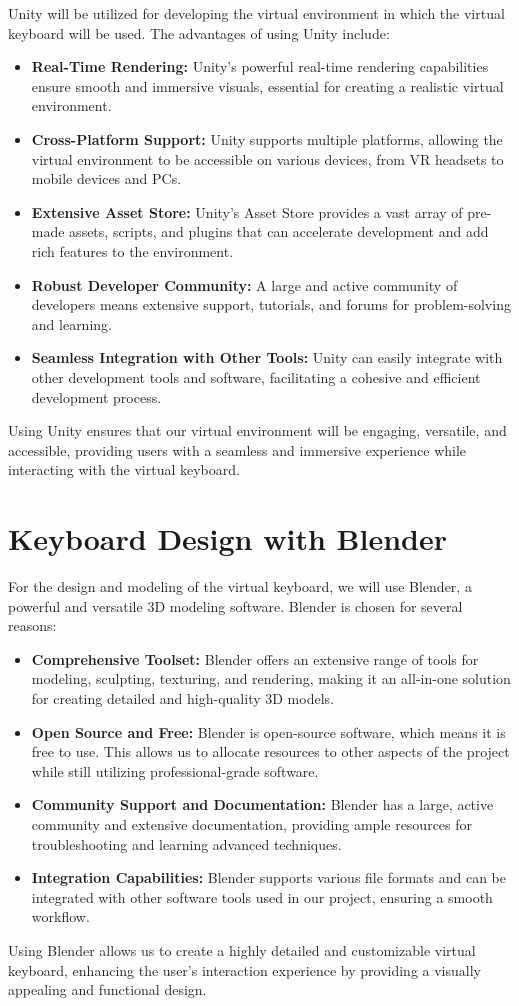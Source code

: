 Unity will be utilized for developing the virtual environment in which the virtual keyboard will be used. The advantages of using Unity include:
\begin{itemize}
\item \textbf{Real-Time Rendering:} Unity's powerful real-time rendering capabilities ensure smooth and immersive visuals, essential for creating a realistic virtual environment.
\item \textbf{Cross-Platform Support:} Unity supports multiple platforms, allowing the virtual environment to be accessible on various devices, from VR headsets to mobile devices and PCs.
\item \textbf{Extensive Asset Store:} Unity's Asset Store provides a vast array of pre-made assets, scripts, and plugins that can accelerate development and add rich features to the environment.
\item \textbf{Robust Developer Community:} A large and active community of developers means extensive support, tutorials, and forums for problem-solving and learning.
\item \textbf{Seamless Integration with Other Tools:} Unity can easily integrate with other development tools and software, facilitating a cohesive and efficient development process.
\end{itemize}
Using Unity ensures that our virtual environment will be engaging, versatile, and accessible, providing users with a seamless and immersive experience while interacting with the virtual keyboard.


\section{Keyboard Design with Blender}
\label{subsec:KeyboardDesignWithBlender}

For the design and modeling of the virtual keyboard, we will use Blender, a powerful and versatile 3D modeling software. Blender is chosen for several reasons:
\begin{itemize}
\item \textbf{Comprehensive Toolset:} Blender offers an extensive range of tools for modeling, sculpting, texturing, and rendering, making it an all-in-one solution for creating detailed and high-quality 3D models.
\item \textbf{Open Source and Free:} Blender is open-source software, which means it is free to use. This allows us to allocate resources to other aspects of the project while still utilizing professional-grade software.
\item \textbf{Community Support and Documentation:} Blender has a large, active community and extensive documentation, providing ample resources for troubleshooting and learning advanced techniques.
\item \textbf{Integration Capabilities:} Blender supports various file formats and can be integrated with other software tools used in our project, ensuring a smooth workflow.
\end{itemize}
Using Blender allows us to create a highly detailed and customizable virtual keyboard, enhancing the user's interaction experience by providing a visually appealing and functional design.


